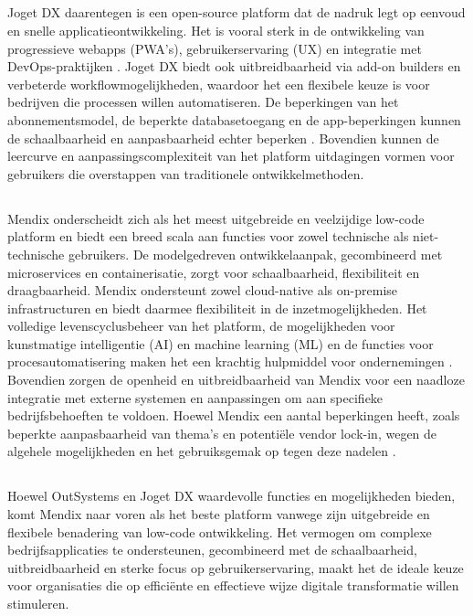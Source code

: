 \subsection{}
Joget DX daarentegen is een open-source platform dat de nadruk legt op eenvoud en snelle applicatieontwikkeling. Het is vooral sterk in de ontwikkeling van progressieve webapps (PWA's), gebruikerservaring (UX) en integratie met DevOps-praktijken \autocite{Sido2024}. Joget DX biedt ook uitbreidbaarheid via add-on builders en verbeterde workflowmogelijkheden, waardoor het een flexibele keuze is voor bedrijven die processen willen automatiseren. De beperkingen van het abonnementsmodel, de beperkte databasetoegang en de app-beperkingen kunnen de schaalbaarheid en aanpasbaarheid echter beperken \autocite{Sido2024}. Bovendien kunnen de leercurve en aanpassingscomplexiteit van het platform uitdagingen vormen voor gebruikers die overstappen van traditionele ontwikkelmethoden.
\subsection{}
Mendix onderscheidt zich als het meest uitgebreide en veelzijdige low-code platform en biedt een breed scala aan functies voor zowel technische als niet-technische gebruikers. De modelgedreven ontwikkelaanpak, gecombineerd met microservices en containerisatie, zorgt voor schaalbaarheid, flexibiliteit en draagbaarheid. Mendix ondersteunt zowel cloud-native als on-premise infrastructuren en biedt daarmee flexibiliteit in de inzetmogelijkheden. Het volledige levenscyclusbeheer van het platform, de mogelijkheden voor kunstmatige intelligentie (AI) en machine learning (ML) en de functies voor procesautomatisering maken het een krachtig hulpmiddel voor ondernemingen \autocite{Sido2024}. Bovendien zorgen de openheid en uitbreidbaarheid van Mendix voor een naadloze integratie met externe systemen en aanpassingen om aan specifieke bedrijfsbehoeften te voldoen. Hoewel Mendix een aantal beperkingen heeft, zoals beperkte aanpasbaarheid van thema's en potentiële vendor lock-in, wegen de algehele mogelijkheden en het gebruiksgemak op tegen deze nadelen \autocite{Sido2024}.
\subsection{}
Hoewel OutSystems en Joget DX waardevolle functies en mogelijkheden bieden, komt Mendix naar voren als het beste platform vanwege zijn uitgebreide en flexibele benadering van low-code ontwikkeling. Het vermogen om complexe bedrijfsapplicaties te ondersteunen, gecombineerd met de schaalbaarheid, uitbreidbaarheid en sterke focus op gebruikerservaring, maakt het de ideale keuze voor organisaties die op efficiënte en effectieve wijze digitale transformatie willen stimuleren.

